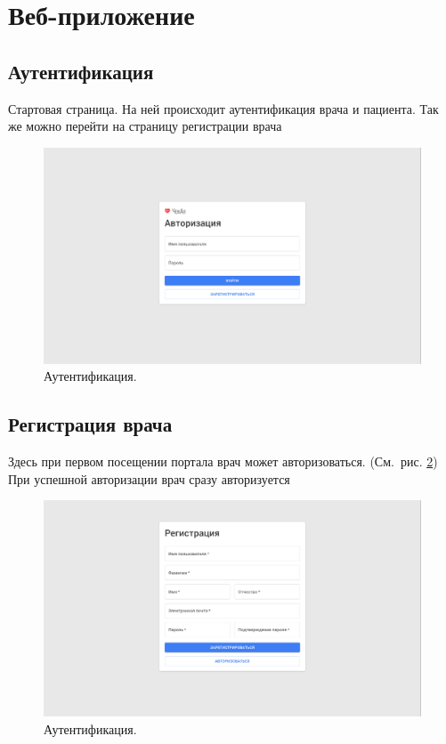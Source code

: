 \section{Веб-приложение}\label{sec:-2}

\subsection{Аутентификация}\label{subsec:}
Стартовая страница.
На ней происходит аутентификация врача и пациента.
Так же можно перейти на страницу регистрации врача
\begin{figure}[h]
    \centering
    \includegraphics[width=\textwidth]{images/screenshots/auth}
    \caption{Аутентификация.}
    \label{fig:figure4}
\end{figure}


\subsection{Регистрация врача}\label{subsec:-5}
Здесь при первом посещении портала врач может авторизоваться.
(См.\ рис. \ref{fig:figure41})
При успешной авторизации врач сразу авторизуется
\begin{figure}[h]
    \centering
    \includegraphics[width=\textwidth]{images/screenshots/doctor_registration}
    \caption{Аутентификация.}
    \label{fig:figure41}
\end{figure}


